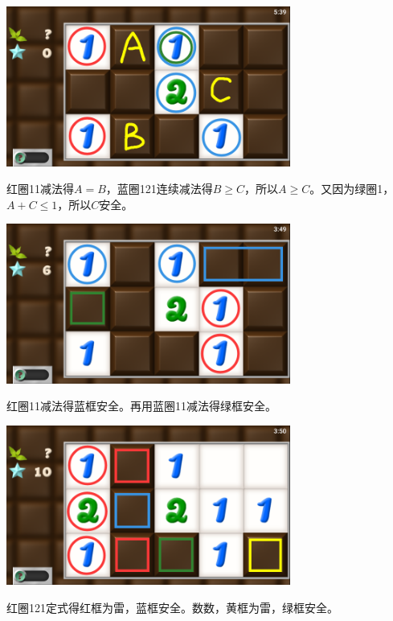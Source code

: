 \subsection{} %
\begin{center}
    \includegraphics[width=0.7\textwidth]{puzzle/96-1.png}
\end{center}
红圈11减法得$A=B$，蓝圈121连续减法得$B\ge C$，所以$A\ge C$。又因为绿圈1，$A+C\le 1$，所以$C$安全。
\begin{center}
    \includegraphics[width=0.7\textwidth]{puzzle/96-2.png}
\end{center}
红圈11减法得蓝框安全。再用蓝圈11减法得绿框安全。
\begin{center}
    \includegraphics[width=0.7\textwidth]{puzzle/96-3.png}
\end{center}
红圈121定式得红框为雷，蓝框安全。数数，黄框为雷，绿框安全。

